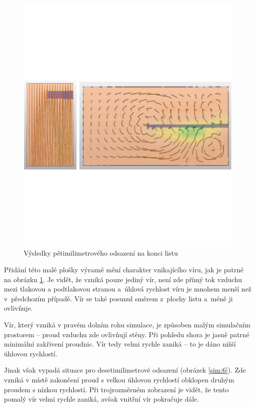 \begin{figure}[H]
	\centering
	\includegraphics[]{obrazky/simulace/simulace5p}
	\caption{Výsledky pětimilimetrového odsazení na konci listu}
	\label{sim:5}
\end{figure}
Přidání této malé plošky výrazně mění charakter vnikajícího víru, jak je patrné na obrázku \ref{sim:5}. Je vidět, že vzniká pouze jediný vír, není zde přímý tok vzduchu mezi tlakovou a podtlakovou stranou a~úhlová rychlost víru je mnohem menší než v~předchozím případě. Vír se také posunul směrem z~plochy listu a~méně ji ovlivňuje.

Vír, který vzniká v pravém dolním rohu simulace, je způsoben malým simulačním prostorem – proud vzduchu zde ovlivňují stěny.
Při pohledu shora je jasně patrné minimální zakřivení proudnic. Vír tedy velmi rychle zaniká – to je dáno nižší úhlovou rychlostí.

Jinak však vypadá situace pro desetimilimetrové odsazení (obrázek \ref{sim:6}). Zde vzniká v místě zakončení proud s velkou úhlovou rychlostí obklopen druhým proudem s nízkou rychlostí. Při trojrozměrném zobrazení je vidět, že tento pomalý vír velmi rychle zaniká, avšak vnitřní vír pokračuje dále.

